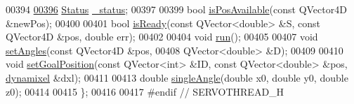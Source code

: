 \begin{DoxyCode}
00394     
\hypertarget{a00024_source_l00396}{}\hyperlink{a00009_a8d2299f41165bffe1656df776f7f7528}{00396}     \hyperlink{a00009_a3c23985ab5e94c14f5e6fca0a9338f9c}{Status} \hyperlink{a00009_a8d2299f41165bffe1656df776f7f7528}{\_status};
00397     
00399     \textcolor{keywordtype}{bool} \hyperlink{a00009_a6f6035054ecb8fe51bcdacae5da7cb0e}{isPosAvailable}(\textcolor{keyword}{const} QVector4D &newPos);
00400     
00401     \textcolor{keywordtype}{bool} \hyperlink{a00009_a1d96ca800864243478463b0306ed74d7}{isReady}(\textcolor{keyword}{const} QVector<double> &S, \textcolor{keyword}{const} QVector4D &pos, \textcolor{keywordtype}{double} err);
00402     
00404     \textcolor{keywordtype}{void} \hyperlink{a00009_aeeb31b85abf7eb5c701853a6d25e51e0}{run}();
00405     
00407     \textcolor{keywordtype}{void} \hyperlink{a00009_a61d2ed44bb73cd337aa81963cb0ef858}{setAngles}(\textcolor{keyword}{const} QVector4D &pos, 
00408                    QVector<double> &D);
00409     
00410     \textcolor{keywordtype}{void} \hyperlink{a00009_a5271acc6d57f9c8c9a92a032851ca135}{setGoalPosition}(\textcolor{keyword}{const} QVector<int> &ID, \textcolor{keyword}{const} QVector<double> &pos, 
      \hyperlink{a00004}{dynamixel} &dxl);
00411     
00413     \textcolor{keywordtype}{double} \hyperlink{a00009_add4637d917a772c4c01a43b5b66da2be}{singleAngle}(\textcolor{keywordtype}{double} x0, \textcolor{keywordtype}{double} y0, \textcolor{keywordtype}{double} z0);
00414     
00415 \};
00416 
00417 \textcolor{preprocessor}{#endif // SERVOTHREAD\_H}
\end{DoxyCode}
